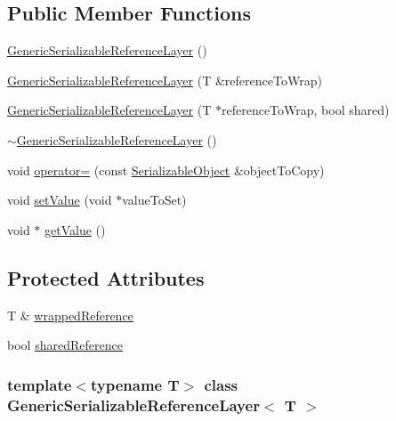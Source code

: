 \subsection*{Public Member Functions}
\begin{DoxyCompactItemize}
\item 
\hyperlink{class_generic_serializable_reference_layer_aa9ff163af2fd2222ef78a88fce1adbae}{GenericSerializableReferenceLayer} ()
\item 
\hyperlink{class_generic_serializable_reference_layer_ac692a2ade9c16d62f9f46d87e37174ae}{GenericSerializableReferenceLayer} (T \&referenceToWrap)
\item 
\hyperlink{class_generic_serializable_reference_layer_a26b972cb59bae4c7efd696440df92bd0}{GenericSerializableReferenceLayer} (T $\ast$referenceToWrap, bool shared)
\item 
\hyperlink{class_generic_serializable_reference_layer_aecc6c89a7c87e3ae977d8ac19b1b3748}{$\sim$GenericSerializableReferenceLayer} ()
\item 
void \hyperlink{class_generic_serializable_reference_layer_a9f13cd98ed1d2009853324a421c1734f}{operator=} (const \hyperlink{class_serializable_object}{SerializableObject} \&objectToCopy)
\item 
void \hyperlink{class_generic_serializable_reference_layer_aece870dcf7dae45f8fd1c43f6949571d}{setValue} (void $\ast$valueToSet)
\item 
void $\ast$ \hyperlink{class_generic_serializable_reference_layer_a47fe0a407cfb0bf963a2d8355e2a162c}{getValue} ()
\end{DoxyCompactItemize}
\subsection*{Protected Attributes}
\begin{DoxyCompactItemize}
\item 
T \& \hyperlink{class_generic_serializable_reference_layer_a7d3c38c131eec2f749565fe837964d38}{wrappedReference}
\item 
bool \hyperlink{class_generic_serializable_reference_layer_ac27eb631cf3a02ab76c8ffee0c62fe05}{sharedReference}
\end{DoxyCompactItemize}
\subsubsection*{template$<$typename T$>$ class GenericSerializableReferenceLayer$<$ T $>$}



